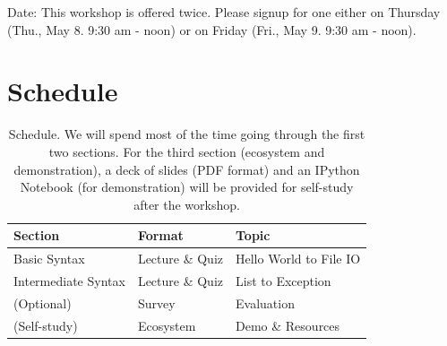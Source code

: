 \documentclass{tufte-handout}
\begin{document}
\noindent Date: This workshop is offered twice. Please signup for 
one either on Thursday (Thu., May 8. 9:30 am - noon) or on Friday 
(Fri., May 9. 9:30 am - noon).

\section{Schedule}\label{sec:schedule}
\begin{table}[ht]
  \selectfont
  \begin{tabular}{lll}
    \toprule
    Section & Format & Topic \\
    \midrule
    Basic Syntax & Lecture \& Quiz & Hello World to File IO \\
    Intermediate Syntax & Lecture \& Quiz & List to Exception \\
    (Optional) & Survey & Evaluation \\
    (Self-study) & Ecosystem & Demo \& Resources \\
    \bottomrule
  \end{tabular}
  \caption{Schedule. 
    We will spend most of the time going through the first two
    sections. For the third section (ecosystem and demonstration),
    a deck of slides (PDF format) and an IPython Notebook (for
    demonstration) will be provided for self-study after the workshop.}
  \label{tab:Schedule}
\end{table}
\end{document}
